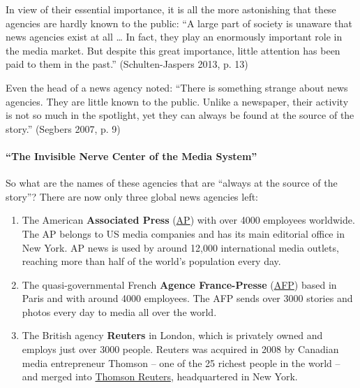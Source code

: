In view of their essential importance, it is all the more astonishing
that these agencies are hardly known to the public: ``A large part of
society is unaware that news agencies exist at all \ldots{} In fact,
they play an enormously important role in the media market. But despite
this great importance, little attention has been paid to them in the
past.'' (Schulten-Jaspers 2013, p. 13)

Even the head of a news agency noted: ``There is something strange about
news agencies. They are little known to the public. Unlike a newspaper,
their activity is not so much in the spotlight, yet they can always be
found at the source of the story.'' (Segbers 2007, p. 9)

\hypertarget{the-invisible-nerve-center-of-the-media-system}{%
\paragraph{``The Invisible Nerve Center of the Media
System''}\label{the-invisible-nerve-center-of-the-media-system}}

So what are the names of these agencies that are ``always at the source
of the story''? There are now only three global news agencies left:

\begin{enumerate}
\def\labelenumi{\arabic{enumi}.}
\tightlist
\item
  The American \textbf{Associated Press}
  (\href{https://en.wikipedia.org/wiki/Associated_Press}{AP}) with over
  4000 employees worldwide. The AP belongs to US media companies and has
  its main editorial office in New York. AP news is used by around
  12,000 international media outlets, reaching more than half of the
  world's population every day.
\item
  The quasi-governmental French \textbf{Agence France-Presse}
  (\href{https://en.wikipedia.org/wiki/Agence_France-Presse}{AFP}) based
  in Paris and with around 4000 employees. The AFP sends over 3000
  stories and photos every day to media all over the world.
\item
  The British agency \textbf{Reuters} in London, which is privately
  owned and employs just over 3000 people. Reuters was acquired in 2008
  by Canadian media entrepreneur Thomson -- one of the 25 richest people
  in the world -- and merged into
  \href{https://en.wikipedia.org/wiki/Reuters}{Thomson Reuters},
  headquartered in New York.
\end{enumerate}

